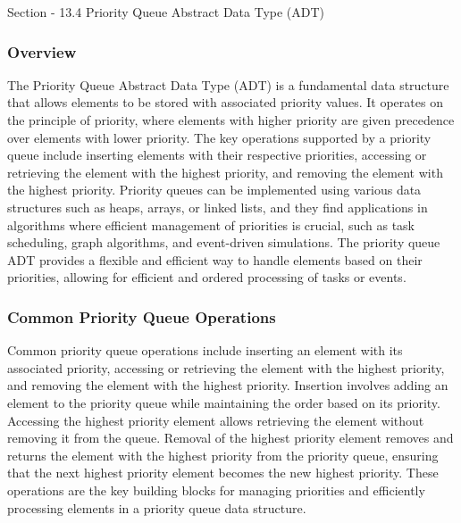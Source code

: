 \begin{notes}{Section - 13.4 Priority Queue Abstract Data Type (ADT)}
    \subsubsection*{Overview}

    The Priority Queue Abstract Data Type (ADT) is a fundamental data structure that allows elements to be stored with associated priority values. It operates on the principle of priority, where elements 
    with higher priority are given precedence over elements with lower priority. The key operations supported by a priority queue include inserting elements with their respective priorities, accessing or 
    retrieving the element with the highest priority, and removing the element with the highest priority. Priority queues can be implemented using various data structures such as heaps, arrays, or linked 
    lists, and they find applications in algorithms where efficient management of priorities is crucial, such as task scheduling, graph algorithms, and event-driven simulations. The priority queue ADT 
    provides a flexible and efficient way to handle elements based on their priorities, allowing for efficient and ordered processing of tasks or events.
    
    \subsubsection*{Common Priority Queue Operations}
    
    Common priority queue operations include inserting an element with its associated priority, accessing or retrieving the element with the highest priority, and removing the element with the highest priority. 
    Insertion involves adding an element to the priority queue while maintaining the order based on its priority. Accessing the highest priority element allows retrieving the element without removing it from the 
    queue. Removal of the highest priority element removes and returns the element with the highest priority from the priority queue, ensuring that the next highest priority element becomes the new highest priority. 
    These operations are the key building blocks for managing priorities and efficiently processing elements in a priority queue data structure.
    

\end{notes}
